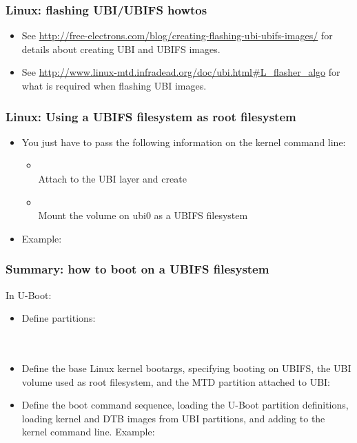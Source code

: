 \begin{frame}
  \frametitle{Linux: flashing UBI/UBIFS howtos}
  \begin{itemize}
  \item See
    \url{http://free-electrons.com/blog/creating-flashing-ubi-ubifs-images/}
    for details about creating UBI and UBIFS images.
  \item See
    \url{http://www.linux-mtd.infradead.org/doc/ubi.html\#L_flasher_algo}
    for what is required when flashing UBI images.
  \end{itemize}
\end{frame}

\begin{frame}
  \frametitle{Linux: Using a UBIFS filesystem as root filesystem}
  \begin{itemize}
  \item You just have to pass the following information on the kernel
    command line:
    \begin{itemize}
    \item {}\\
      Attach  to the UBI layer and create 
    \item {}\\
      Mount the  volume on ubi0 as a UBIFS filesystem
    \end{itemize}
  \item Example: 
  \end{itemize}
\end{frame}

\begin{frame}
  \frametitle{Summary: how to boot on a UBIFS filesystem}
  In U-Boot:
  \begin{itemize}
  \item Define partitions:\\
     \\
     \\
  \item Define the base Linux kernel bootargs, specifying booting
     on UBIFS, the UBI volume used as root filesystem, and the MTD
     partition attached to UBI:\\
  \item Define the boot command sequence, loading the U-Boot partition
     definitions, loading kernel and DTB images from UBI partitions,
     and adding  to the kernel command
     line. Example:\\
  \end{itemize}
\end{frame}

